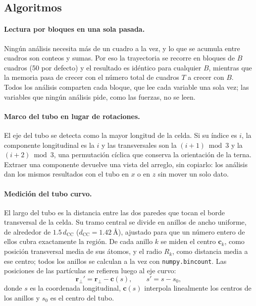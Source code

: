 \documentclass[11pt,a4paper]{article}
\begin{document}
\subsection{Algoritmos}\label{sec:algoritmos}

\paragraph{Lectura por bloques en una sola pasada.} Ningún análisis necesita
más de un cuadro a la vez, y lo que se acumula entre cuadros son conteos y
sumas. Por eso la trayectoria se recorre en bloques de $B$ cuadros (50 por
defecto) y el resultado es idéntico para cualquier $B$, mientras que la
memoria pasa de crecer con el número total de cuadros $T$ a crecer con $B$.
Todos los análisis comparten cada bloque, que lee cada variable una sola
vez; las variables que ningún análisis pide, como las fuerzas, no se leen.

\paragraph{Marco del tubo en lugar de rotaciones.} El eje del tubo se detecta
como la mayor longitud de la celda. Si su índice es $i$, la componente
longitudinal es la $i$ y las transversales son la $(i+1) \bmod 3$ y la
$(i+2) \bmod 3$, una permutación cíclica que conserva la orientación de la
terna. Extraer una componente devuelve una vista del arreglo, sin copiarlo:
los análisis dan los mismos resultados con el tubo en $x$ o en $z$ sin mover
un solo dato.

\paragraph{Medición del tubo curvo.} El largo del tubo es la distancia entre
las dos paredes que tocan el borde transversal de la celda. Su tramo central
se divide en anillos de ancho uniforme, de alrededor de
$1.5\,d_\text{CC}$ ($d_\text{CC} = \SI{1.42}{\angstrom}$), ajustado para que
un número entero de ellos cubra exactamente la región. De cada anillo $k$ se
miden el centro $\mathbf{c}_k$, como posición transversal media de sus
átomos, y el radio $R_k$, como distancia media a ese centro; todos los
anillos se calculan a la vez con \texttt{numpy.bincount}. Las posiciones de
las partículas se refieren luego al eje curvo:
\begin{equation}
    \mathbf{r}_\perp' = \mathbf{r}_\perp - \mathbf{c}(s), \qquad
    s' = s - s_0,
\end{equation}
donde $s$ es la coordenada longitudinal, $\mathbf{c}(s)$ interpola
linealmente los centros de los anillos y $s_0$ es el centro del tubo.
\end{document}

